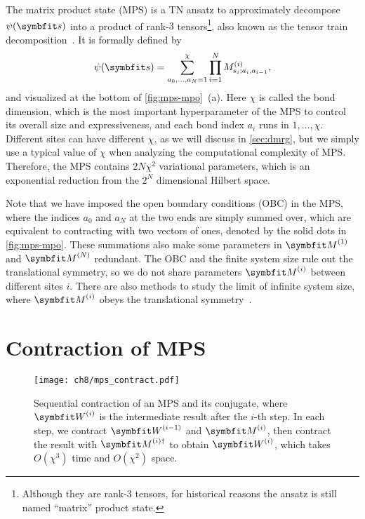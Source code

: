 The matrix product state (MPS) is a TN ansatz to approximately decompose $\psi(\vs)$ into a product of rank-$3$ tensors\footnote{Although they are rank-$3$ tensors, for historical reasons the ansatz is still named ``matrix'' product state.}, also known as the tensor train decomposition~\cite{oseledets2011tensor}. It is formally defined by
\begin{equation}
\psi(\vs) = \sum_{a_0, \ldots, a_N = 1}^\chi \prod_{i = 1}^N M^{(i)}_{s_i; a_i, a_{i - 1}},
\label{eq:mps}
\end{equation}
and visualized at the bottom of \cref{fig:mps-mpo}~(a). Here $\chi$ is called the bond dimension, which is the most important hyperparameter of the MPS to control its overall size and expressiveness, and each bond index $a_i$ runs in $1, \ldots, \chi$. Different sites can have different $\chi$, as we will discuss in \cref{sec:dmrg}, but we simply use a typical value of $\chi$ when analyzing the computational complexity of MPS. Therefore, the MPS contains $2 N \chi^2$ variational parameters, which is an exponential reduction from the $2^N$ dimensional Hilbert space.

Note that we have imposed the open boundary conditions (OBC) in the MPS, where the indices $a_0$ and $a_N$ at the two ends are simply summed over, which are equivalent to contracting with two vectors of ones, denoted by the solid dots in \cref{fig:mps-mpo}. These summations also make some parameters in $\mM^{(1)}$ and $\mM^{(N)}$ redundant. The OBC and the finite system size rule out the translational symmetry, so we do not share parameters $\mM^{(i)}$ between different sites $i$. There are also methods to study the limit of infinite system size, where $\mM^{(i)}$ obeys the translational symmetry~\cite{mcculloch2008infinite}.

\section{Contraction of MPS}
\label{sec:mps-contract}

\begin{figure}[htb]
\centering
\texttt{[image: ch8/mps\_contract.pdf]} \hspace{2cm}
\caption[Sequential contraction of MPS]{
Sequential contraction of an MPS and its conjugate, where $\mW^{(i)}$ is the intermediate result after the $i$-th step. In each step, we contract $\mW^{(i - 1)}$ and $\mM^{(i)}$, then contract the result with $\mM^{(i) \dagger}$ to obtain $\mW^{(i)}$, which takes $O(\chi^3)$ time and $O(\chi^2)$ space.
}
\label{fig:mps-contract}
\end{figure}

